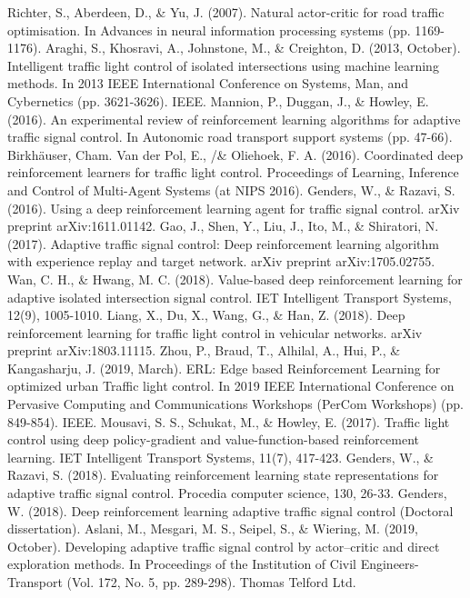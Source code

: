 \documentclass[conference]{IEEEtran}
\begin{document}
\begin{thebibliography}{00}
 Richter, S., Aberdeen, D., \& Yu, J. (2007). Natural actor-critic for road traffic optimisation. In Advances in neural information processing systems (pp. 1169-1176).
 Araghi, S., Khosravi, A., Johnstone, M., \& Creighton, D. (2013, October). Intelligent traffic light control of isolated intersections using machine learning methods. In 2013 IEEE International Conference on Systems, Man, and Cybernetics (pp. 3621-3626). IEEE.
 Mannion, P., Duggan, J., \& Howley, E. (2016). An experimental review of reinforcement learning algorithms for adaptive traffic signal control. In Autonomic road transport support systems (pp. 47-66). Birkhäuser, Cham.
 Van der Pol, E., /\& Oliehoek, F. A. (2016). Coordinated deep reinforcement learners for traffic light control. Proceedings of Learning, Inference and Control of Multi-Agent Systems (at NIPS 2016).
 Genders, W., \& Razavi, S. (2016). Using a deep reinforcement learning agent for traffic signal control. arXiv preprint arXiv:1611.01142.
 Gao, J., Shen, Y., Liu, J., Ito, M., \& Shiratori, N. (2017). Adaptive traffic signal control: Deep reinforcement learning algorithm with experience replay and target network. arXiv preprint arXiv:1705.02755.
 Wan, C. H., \& Hwang, M. C. (2018). Value-based deep reinforcement learning for adaptive isolated intersection signal control. IET Intelligent Transport Systems, 12(9), 1005-1010.
 Liang, X., Du, X., Wang, G., \& Han, Z. (2018). Deep reinforcement learning for traffic light control in vehicular networks. arXiv preprint arXiv:1803.11115.
 Zhou, P., Braud, T., Alhilal, A., Hui, P., \& Kangasharju, J. (2019, March). ERL: Edge based Reinforcement Learning for optimized urban Traffic light control. In 2019 IEEE International Conference on Pervasive Computing and Communications Workshops (PerCom Workshops) (pp. 849-854). IEEE.
 Mousavi, S. S., Schukat, M., \& Howley, E. (2017). Traffic light control using deep policy-gradient and value-function-based reinforcement learning. IET Intelligent Transport Systems, 11(7), 417-423.
 Genders, W., \& Razavi, S. (2018). Evaluating reinforcement learning state representations for adaptive traffic signal control. Procedia computer science, 130, 26-33.
 Genders, W. (2018). Deep reinforcement learning adaptive traffic signal control (Doctoral dissertation).
 Aslani, M., Mesgari, M. S., Seipel, S., \& Wiering, M. (2019, October). Developing adaptive traffic signal control by actor–critic and direct exploration methods. In Proceedings of the Institution of Civil Engineers-Transport (Vol. 172, No. 5, pp. 289-298). Thomas Telford Ltd.

\end{thebibliography}
\end{document}
